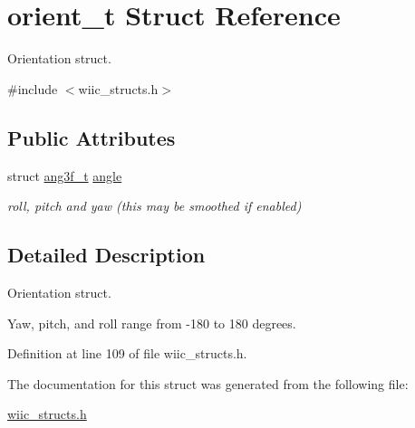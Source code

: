 \hypertarget{structorient__t}{\section{orient\-\_\-t Struct Reference}
\label{structorient__t}
}


Orientation struct.  




{\ttfamily \#include $<$wiic\-\_\-structs.\-h$>$}

\subsection*{Public Attributes}
\begin{DoxyCompactItemize}
\item 
\hypertarget{structorient__t_a0703101bf0e89193a67f55d07e83822e}{struct \hyperlink{structang3f__t}{ang3f\-\_\-t} \hyperlink{structorient__t_a0703101bf0e89193a67f55d07e83822e}{angle}}\label{structorient__t_a0703101bf0e89193a67f55d07e83822e}

\begin{DoxyCompactList}\small\item\em roll, pitch and yaw (this may be smoothed if enabled) \end{DoxyCompactList}\end{DoxyCompactItemize}


\subsection{Detailed Description}
Orientation struct. 

Yaw, pitch, and roll range from -\/180 to 180 degrees. 

Definition at line 109 of file wiic\-\_\-structs.\-h.



The documentation for this struct was generated from the following file\-:\begin{DoxyCompactItemize}
\item 
\hyperlink{wiic__structs_8h}{wiic\-\_\-structs.\-h}\end{DoxyCompactItemize}
